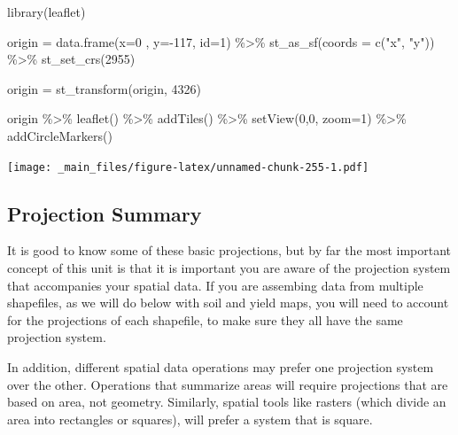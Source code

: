 \documentclass[
]{book}
\newenvironment{Shaded}{\begin{snugshade}}{\end{snugshade}}
\newcommand{\AttributeTok}[1]{\textcolor[rgb]{0.77,0.63,0.00}{#1}}
\newcommand{\DecValTok}[1]{\textcolor[rgb]{0.00,0.00,0.81}{#1}}
\newcommand{\FunctionTok}[1]{\textcolor[rgb]{0.00,0.00,0.00}{#1}}
\newcommand{\NormalTok}[1]{#1}
\newcommand{\OtherTok}[1]{\textcolor[rgb]{0.56,0.35,0.01}{#1}}
\newcommand{\SpecialCharTok}[1]{\textcolor[rgb]{0.00,0.00,0.00}{#1}}
\newcommand{\StringTok}[1]{\textcolor[rgb]{0.31,0.60,0.02}{#1}}
\begin{document}
\begin{Shaded}
\begin{Highlighting}[]
\FunctionTok{library}\NormalTok{(leaflet)}

\NormalTok{origin }\OtherTok{=} \FunctionTok{data.frame}\NormalTok{(}\AttributeTok{x=}\DecValTok{0}\NormalTok{ , }\AttributeTok{y=}\SpecialCharTok{{-}}\DecValTok{117}\NormalTok{, }\AttributeTok{id=}\DecValTok{1}\NormalTok{) }\SpecialCharTok{\%\textgreater{}\%}
  \FunctionTok{st\_as\_sf}\NormalTok{(}\AttributeTok{coords =} \FunctionTok{c}\NormalTok{(}\StringTok{"x"}\NormalTok{, }\StringTok{"y"}\NormalTok{)) }\SpecialCharTok{\%\textgreater{}\%}
  \FunctionTok{st\_set\_crs}\NormalTok{(}\DecValTok{2955}\NormalTok{) }

\NormalTok{origin }\OtherTok{=} \FunctionTok{st\_transform}\NormalTok{(origin, }\DecValTok{4326}\NormalTok{)}
  
\NormalTok{origin }\SpecialCharTok{\%\textgreater{}\%} 
  \FunctionTok{leaflet}\NormalTok{() }\SpecialCharTok{\%\textgreater{}\%}
  \FunctionTok{addTiles}\NormalTok{() }\SpecialCharTok{\%\textgreater{}\%}
  \FunctionTok{setView}\NormalTok{(}\DecValTok{0}\NormalTok{,}\DecValTok{0}\NormalTok{, }\AttributeTok{zoom=}\DecValTok{1}\NormalTok{) }\SpecialCharTok{\%\textgreater{}\%}
  \FunctionTok{addCircleMarkers}\NormalTok{() }
\end{Highlighting}
\end{Shaded}

\texttt{[image: \_main\_files/figure-latex/unnamed-chunk-255-1.pdf]}

\hypertarget{projection-summary}{%
\subsection{Projection Summary}\label{projection-summary}}

It is good to know some of these basic projections, but by far the most important concept of this unit is that it is important you are aware of the projection system that accompanies your spatial data. If you are assembing data from multiple shapefiles, as we will do below with soil and yield maps, you will need to account for the projections of each shapefile, to make sure they all have the same projection system.

In addition, different spatial data operations may prefer one projection system over the other. Operations that summarize areas will require projections that are based on area, not geometry. Similarly, spatial tools like rasters (which divide an area into rectangles or squares), will prefer a system that is square.
\end{document}
